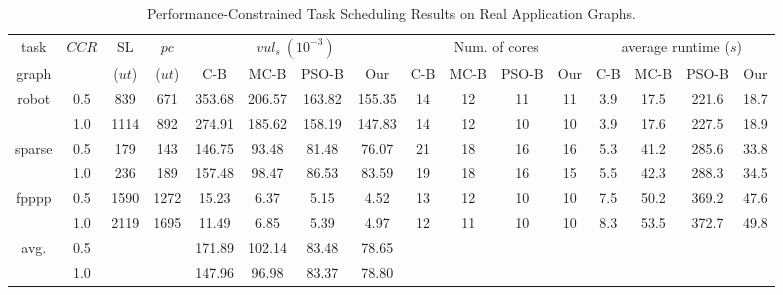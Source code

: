 \documentclass[10pt,journal, compsoc]{IEEEtran}
\begin{document}
\begin{table}[!t]
\renewcommand{\arraystretch}{1.1}
\caption{Performance-Constrained Task Scheduling Results on Real Application Graphs.}
\centering
\begin{tabular}{c|c|c|c|cccc|cccc|cccc}
\hline
\hline
task                                      &\multicolumn{1}{c|}{\multirow{2}{*}{$CCR$}}     &SL       &$pc$      &\multicolumn{4}{c|}{$vul_s~(10^{-3})$}        &\multicolumn{4}{c|}{Num. of cores}    &\multicolumn{4}{c}{average runtime ($s$)}    \\ \cline{5-8} \cline{9-12} \cline{13-16}
graph                                                                               &                                                &($ut$)   &($ut$)    &C-B  &MC-B &PSO-B   &Our   &C-B      &MC-B  &PSO-B  &Our    &C-B       &MC-B  &PSO-B  &Our  \\

\hline
\hline

\multicolumn{1}{c|}{\multirow{2}{*}{robot}}       &0.5  &839   &671  &353.68    &206.57   &163.82  &155.35    &14    &12  &11  &11    &3.9     &17.5  &221.6  &18.7            \\
                                                  &1.0  &1114  &892  &274.91    &185.62   &158.19  &147.83    &14    &12  &10  &10    &3.9     &17.6  &227.5  &18.9             \\
\hline

\multicolumn{1}{c|}{\multirow{2}{*}{sparse}}     &0.5 &179 &143 &146.75   &93.48   &81.48  &76.07    &21    &18  &16  &16    &5.3     &41.2  &285.6  &33.8          \\
                                                  &1.0 &236  &189 &157.48   &98.47   &86.53  &83.59    &19    &18  &16  &15    &5.5     &42.3  &288.3  &34.5            \\

\hline

\multicolumn{1}{c|}{\multirow{2}{*}{fpppp}}        &0.5 &1590  &1272  &15.23    &6.37    &5.15  &4.52    &13    &12  &10  &10    &7.5     &50.2  &369.2  &47.6             \\
                                                    &1.0 &2119  &1695  &11.49    &6.85   &5.39  &4.97    &12    &11  &10  &10    &8.3     &53.5  &372.7  &49.8            \\

\hline
\multicolumn{1}{c|}{\multirow{2}{*}{avg.}}      &0.5 &      &  &171.89  &102.14   &83.48   &78.65  & & &  &   &  & &         \\
                                                &1.0 &     &  &147.96  &96.98   &83.37   &78.80  & &  & &  &  & &         \\

\hline
\hline
\end{tabular}
\label{table:PCTS_A}
\end{table}
\end{document}
